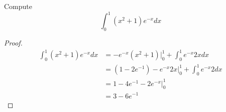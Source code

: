 \documentclass[openany]{book}
\newcommand{\C}{\mathbb{C}}
\begin{document}
\begin{prob}
    Compute 
    \begin{equation*}
        \int_0^1(x^2+1)e^{-x}dx
    \end{equation*}
\end{prob}
\begin{proof}
    \begin{align*}
        \int_0^1(x^2+1)e^{-x}dx&=-e^{-x}(x^2+1)\big\vert_0^1+\int_0^1 e^{-x}2xdx\\
        &=(1-2e^{-1})-e^{-x}2x\big\vert_0^1+\int_0^1 e^{-x}2dx\\
        &=1-4e^{-1}-2e^{-x}\big\vert_0^1\\
        &=3-6e^{-1}
    \end{align*}
\end{proof}




\end{document}
